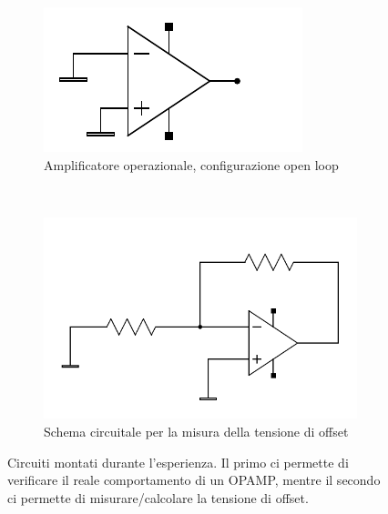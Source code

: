 \begin{figure}[h]
        \centering
        \begin{subfigure}[b]{0.48\textwidth}
                \includegraphics[width=\textwidth]{../figure/v_offset_exists.pdf}
                \caption{Amplificatore operazionale, configurazione open loop}
                \label{fig:open_loop}
        \end{subfigure}
        ~
        \begin{subfigure}[b]{0.48\textwidth}
                \includegraphics[width=\textwidth]{../figure/v_offset.pdf}
                \caption{Schema circuitale per la misura della tensione di offset}
                \label{fig:offset}
        \end{subfigure}
        \caption{Circuiti montati durante l'esperienza. Il primo ci permette di verificare il reale comportamento di un OPAMP, mentre il secondo ci permette di misurare/calcolare la tensione di offset.}
        \label{fig:circuits}
\end{figure}